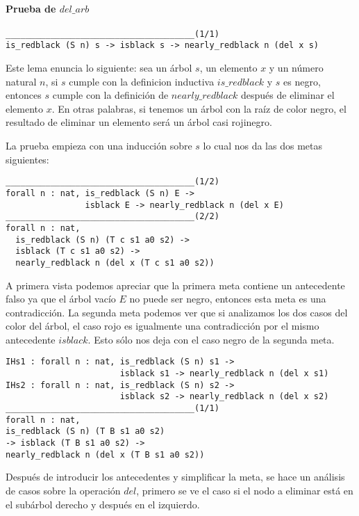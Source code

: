 \paragraph{Prueba de \hyperref[lema_6]{$del\_arb$}}

\begin{verbatim}
______________________________________(1/1)
is_redblack (S n) s -> isblack s -> nearly_redblack n (del x s)
\end{verbatim}

Este lema enuncia lo siguiente: sea un \'arbol $s$, un elemento $x$ y un n\'umero natural $n$, si
$s$ cumple con la definicion inductiva \hyperref[inductive_isRedB]{$is\_redblack$} y $s$ es negro, 
entonces $s$ cumple con la definición de \hyperref[inductive_isRedB]{$nearly\_redblack$} después de 
eliminar el elemento $x$. En otras palabras, si tenemos un \'arbol con la raíz de color negro, el 
resultado de eliminar un elemento ser\'a un \'arbol casi rojinegro.

La prueba empieza con una inducci\'on sobre $s$ lo cual nos da las dos metas siguientes:
\begin{verbatim}
______________________________________(1/2)
forall n : nat, is_redblack (S n) E ->
                isblack E -> nearly_redblack n (del x E)
______________________________________(2/2)
forall n : nat,
  is_redblack (S n) (T c s1 a0 s2) ->
  isblack (T c s1 a0 s2) ->
  nearly_redblack n (del x (T c s1 a0 s2))
\end{verbatim}

A primera vista podemos apreciar que la primera meta contiene un antecedente falso ya que el \'arbol
vacío $E$ no puede ser negro, entonces esta meta es una contradicci\'on. La segunda meta podemos
ver que si analizamos los dos casos del color del \'arbol, el caso rojo es igualmente una
contradicci\'on por el mismo antecedente $isblack$. Esto s\'olo nos deja con el caso negro de la
segunda meta.

\begin{verbatim}
IHs1 : forall n : nat, is_redblack (S n) s1 ->
                       isblack s1 -> nearly_redblack n (del x s1)
IHs2 : forall n : nat, is_redblack (S n) s2 ->
                       isblack s2 -> nearly_redblack n (del x s2)
______________________________________(1/1)
forall n : nat,
is_redblack (S n) (T B s1 a0 s2)
-> isblack (T B s1 a0 s2) ->
nearly_redblack n (del x (T B s1 a0 s2))
\end{verbatim}

Después de introducir los antecedentes y simplificar la meta, se hace un análisis de casos sobre la
operaci\'on \hyperref[func_del]{$del$}, primero se ve el caso si el nodo a eliminar est\'a en el 
subárbol derecho y después en el izquierdo.

